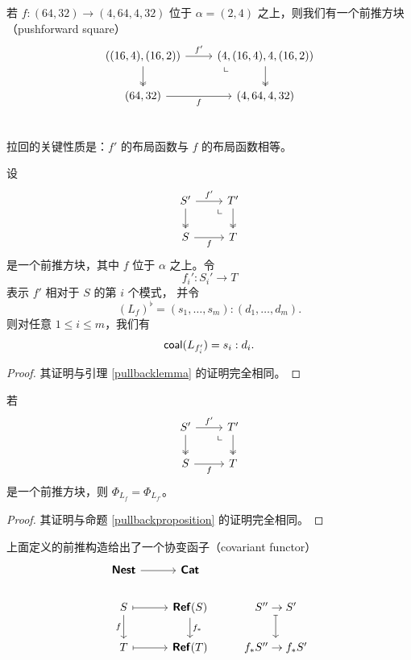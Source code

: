 \begin{example}
    若 $f:(64,32) \to (4,64,4,32)$ 位于 $\alpha = (2,4)$ 之上，则我们有一个前推方块（pushforward square）
    \[ \begin{tikzcd} 
    ((16,4),(16,2)) \ar[r,"f'"] \ar[d,two heads] & \arrow[dl, phantom, "\llcorner", very near start](4,(16,4),4,(16,2)) \ar[d, two heads] \\
    (64,32) \ar[r,swap,"f"] & (4,64,4,32)\\
    \end{tikzcd} \]
\end{example}



拉回的关键性质是：$f'$ 的布局函数与 $f$ 的布局函数相等。

\begin{lemma}\label{pushforwardlemma}
    设
    \[ \begin{tikzcd} 
    S' \ar[r,"f'"] \ar[d, two heads] & T' \ar[d,two heads]\arrow[dl, phantom, "\llcorner", very near start] \\
    S \ar[r,swap,"f"] & T
    \end{tikzcd} \]
    是一个前推方块，其中 $f$ 位于 $\alpha$ 之上。令
    \[f_i' : S_i' \to T\]
    表示 $f'$ 相对于 $S$ 的第 $i$ 个模式，
    并令
    \[(L_f)^\flat = (s_1,\dots,s_m):(d_1,\dots,d_m).\]
    则对任意 $1 \leq i \leq m$，我们有
    \[
    \mathsf{coal}(L_{f_i'}) = s_i:d_i.
    \]
\end{lemma}
\begin{proof}
其证明与引理 \ref{pullbacklemma} 的证明完全相同。
\end{proof}


\begin{proposition}\label{pushforwardproposition}
    若
    \[ \begin{tikzcd} 
    S' \ar[r,"f'"] \ar[d, two heads]  & T' \ar[d,two heads]\arrow[dl, phantom, "\llcorner", very near start] \\
    S \ar[r,swap,"f"] & T
    \end{tikzcd} \]
    是一个前推方块，则 $\Phi_{L_f} = \Phi_{L_{f'}}$。
\end{proposition}

\begin{proof}
    其证明与命题 \ref{pullbackproposition} 的证明完全相同。
\end{proof}



\begin{observation}
    上面定义的前推构造给出了一个协变函子（covariant functor）
    \[ \begin{tikzcd} 
    \catstyle{Nest} \ar[r] & \catstyle{Cat} \\
    S \ar[r,mapsto] \ar[d,swap,"f"] & \catstyle{Ref}(S) \ar[d,"f_*"] & S'' \rightarrow S'\ar[d,mapsto]  \\
    T \ar[r,mapsto]  & \catstyle{Ref}(T)  & f_*S'' \rightarrow f_*S'   
    \end{tikzcd} \]
\end{observation}

